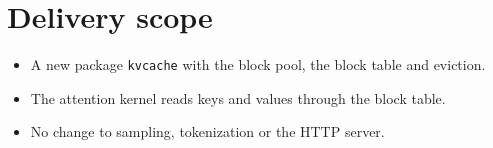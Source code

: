 \section{Delivery scope}
\begin{itemize}
\item A new package \verb|kvcache| with the block pool, the block table and eviction.
\item The attention kernel reads keys and values through the block table.
\item No change to sampling, tokenization or the HTTP server.
\end{itemize}
